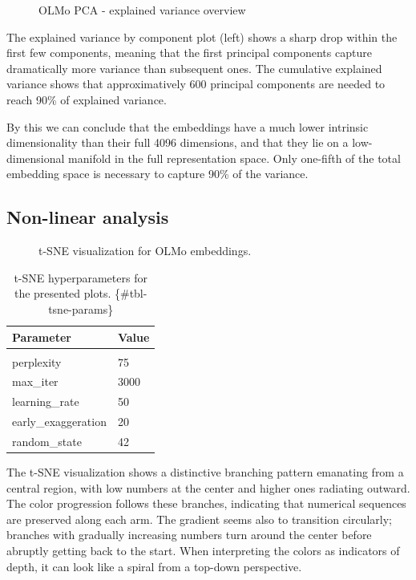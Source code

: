 \documentclass[
  a4paper, twoside, 10pt, titlepage]{book}
\makeatletter
\newcommand*\pandocbounded[1]{%
  \sbox\pandoc@box{#1}%
  \Gscale@div\@tempa{\textheight}{\dimexpr\ht\pandoc@box+\dp\pandoc@box\relax}%
  \Gscale@div\@tempb{\linewidth}{\wd\pandoc@box}%
  \ifdim\@tempb\p@<\@tempa\p@\let\@tempa\@tempb\fi%
  \ifdim\@tempa\p@<\p@\scalebox{\@tempa}{\usebox\pandoc@box}%
  \else\usebox{\pandoc@box}%
  \fi%
}
\makeatother
\begin{document}
\begin{figure}
\centering
\pandocbounded{}
\caption{OLMo PCA - explained variance
overview}\label{fig-olmo-variance}
\end{figure}

The explained variance by component plot (left) shows a sharp drop
within the first few components, meaning that the first principal
components capture dramatically more variance than subsequent ones. The
cumulative explained variance shows that approximatively 600 principal
components are needed to reach 90\% of explained variance.

By this we can conclude that the embeddings have a much lower intrinsic
dimensionality than their full 4096 dimensions, and that they lie on a
low-dimensional manifold in the full representation space. Only
one-fifth of the total embedding space is necessary to capture 90\% of
the variance.

\subsection{Non-linear analysis}\label{non-linear-analysis}

\begin{figure}
\centering
\pandocbounded{}
\caption{t-SNE visualization for OLMo embeddings.}\label{fig-olmo-tsne}
\end{figure}

\begin{longtable}[]{@{}ll@{}}
\toprule\noalign{}
\textbf{Parameter} & \textbf{Value} \\
\midrule\noalign{}
\endhead
\bottomrule\noalign{}
\tabularnewline
\caption{t-SNE hyperparameters for the presented plots.
\{\#tbl-tsne-params\}}
\endlastfoot
perplexity & 75 \\
max\_iter & 3000 \\
learning\_rate & 50 \\
early\_exaggeration & 20 \\
random\_state & 42 \\
\end{longtable}

The t-SNE visualization shows a distinctive branching pattern emanating
from a central region, with low numbers at the center and higher ones
radiating outward. The color progression follows these branches,
indicating that numerical sequences are preserved along each arm. The
gradient seems also to transition circularly; branches with gradually
increasing numbers turn around the center before abruptly getting back
to the start. When interpreting the colors as indicators of depth, it
can look like a spiral from a top-down perspective.
\end{document}
